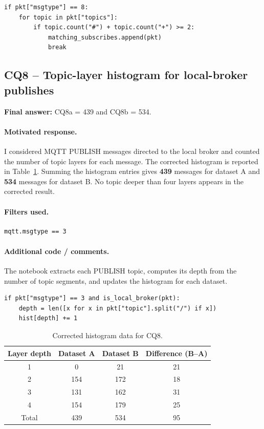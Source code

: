 \documentclass[11pt,a4paper]{article}
\begin{document}
\begin{verbatim}
if pkt["msgtype"] == 8:
    for topic in pkt["topics"]:
        if topic.count("#") + topic.count("+") >= 2:
            matching_subscribes.append(pkt)
            break
\end{verbatim}
\subsection*{CQ8 -- Topic-layer histogram for local-broker publishes}

\textbf{Final answer:} CQ8a = 439 and CQ8b = 534.

\paragraph{Motivated response.}
I considered MQTT PUBLISH messages directed to the local broker and counted the number of
topic layers for each message. The corrected histogram is reported in Table~\ref{tab:cq8}.
Summing the histogram entries gives \textbf{439} messages for dataset A and \textbf{534}
messages for dataset B. No topic deeper than four layers appears in the corrected result.

\paragraph{Filters used.}
\begin{verbatim}
mqtt.msgtype == 3
\end{verbatim}

\paragraph{Additional code / comments.}
The notebook extracts each PUBLISH topic, computes its depth from the number of topic
segments, and updates the histogram for each dataset.

\begin{verbatim}
if pkt["msgtype"] == 3 and is_local_broker(pkt):
    depth = len([x for x in pkt["topic"].split("/") if x])
    hist[depth] += 1
\end{verbatim}

\begin{table}[H]
\centering
\caption{Corrected histogram data for CQ8.}
\label{tab:cq8}
\begin{tabular}{cccc}
\toprule
\textbf{Layer depth} & \textbf{Dataset A} & \textbf{Dataset B} & \textbf{Difference (B--A)} \\
\midrule
1 & 0   & 21  & 21 \\
2 & 154 & 172 & 18 \\
3 & 131 & 162 & 31 \\
4 & 154 & 179 & 25 \\
\midrule
Total & 439 & 534 & 95 \\
\bottomrule
\end{tabular}
\end{table}
\end{document}

